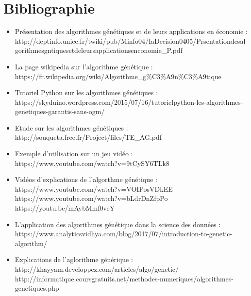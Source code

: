 \documentclass[a4paper,11pt]{article}
\begin{document}
	\section{Bibliographie}
	\begin{itemize}
		\item Présentation des algorithmes génétiques et de leurs applications en économie :\\
		http://deptinfo.unice.fr/twiki/pub/Minfo04/IaDecision0405/Prsentationdesalgorithmesgntiquesetdeleursapplicationsenconomie\_P.pdf\\

		\item La page wikipedia sur l'algorithme génétique : \\
		https://fr.wikipedia.org/wiki/Algorithme\_g$\%$C3$\%$A9n$\%$C3$\%$A9tique\\

		\item Tutoriel Python sur les algorithmes génétiques :\\
		https://skyduino.wordpress.com/2015/07/16/tutorielpython-les-algorithmes-genetiques-garantis-sans-ogm/\\

		\item Etude sur les algorithmes génétiques :\\
		http://souqueta.free.fr/Project/files/TE\_AG.pdf
		
		\item Exemple d'utilisation sur un jeu vidéo :\\
		https://www.youtube.com/watch?v=9tCySY6TLk8\\

		\item Vidéos d'explications de l'algorthme génétique :\\
		https://www.youtube.com/watch?v=VOIPosVDkEE\\
		https://www.youtube.com/watch?v=bLdrDnZfpPo\\
		https://youtu.be/mAybMmf0veY\\

		\item L'application des algorithmes génétique dans la science des données :\\
		https://www.analyticsvidhya.com/blog/2017/07/introduction-to-genetic-algorithm/ 

		\item Explications de l’aglorithme générique :\\
		http://khayyam.developpez.com/articles/algo/genetic/\\
		http://informatique.coursgratuits.net/methodes-numeriques/algorithmes-genetiques.php


\end{itemize}
\end{document}
